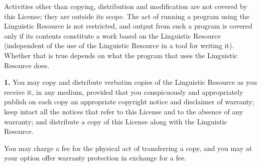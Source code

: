 \documentclass[10pt]{article}
\begin{document}
\vspace{5pt}\noindent
Activities other than copying, distribution and modification are not covered by this License; they are outside its scope. The act of running a program using the Linguistic Resource is not restricted, and output from such a program is covered only if its contents constitute a work based on the Linguistic Resource (independent of the use of the Linguistic Resource in a tool for writing it). Whether that is true depends on what the program that uses the Linguistic Resource does.

\vspace{5pt}\noindent
{\bf 1.}
You may copy and distribute verbatim copies of the Linguistic Resource as you receive it, in any medium, provided that you conspicuously and appropriately publish on each copy an appropriate copyright notice and disclaimer of warranty; keep intact all the notices that refer to this License and to the absence of any warranty; and distribute a copy of this License along with the Linguistic Resource. 

\vspace{5pt}\noindent
You may charge a fee for the physical act of transferring a copy, and you may at your option offer warranty protection in exchange for a fee.
\end{document}
